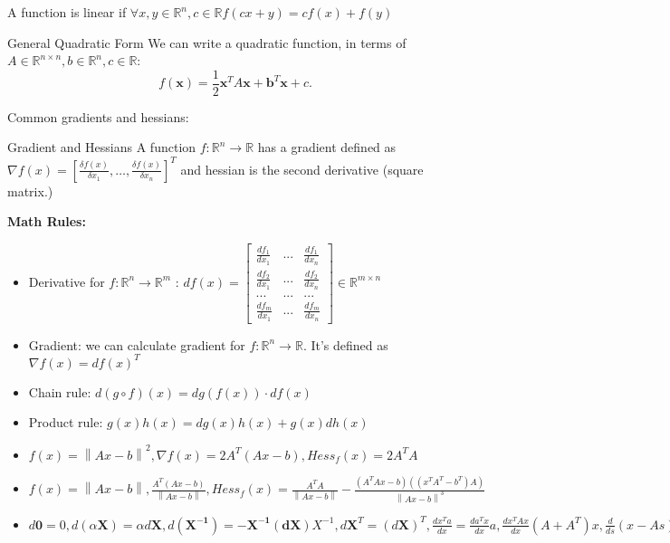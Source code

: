 \documentclass[a4paper]{article}
\begin{document}
A function is linear if $\forall x,y\in\mathbb{R}^n, c\in \mathbb{R} f(cx + y) = cf(x) + f(y)$ 

\begin{subbox}{General Quadratic Form}
    We can write a quadratic function, in terms of $A\in \mathbb{R}^{n\times n}, b\in \mathbb{R}^n, c\in \mathbb{R}$:
    \[
    f(\mathbf{x}) = \frac{1}{2}\mathbf{x}^TA\mathbf{x} + \mathbf{b}^T\mathbf{x} + c
    .\] 
\end{subbox}

Common gradients and hessians:
\begin{mainbox}{Gradient and Hessians}
    A function $f: \mathbb{R}^n \to \mathbb{R}$ has a gradient defined as $\nabla f(x) = \left[\frac{\delta f(x)}{\delta x_1}, \dots, \frac{\delta f(x)}{\delta x_n}\right]^T$ and hessian is the second derivative (square matrix.)   
\end{mainbox}
\textbf{Math Rules:} 
\begin{itemize}
    \item Derivative for $f:\mathbb{R}^n \to \mathbb{R}^m$ :
    $ df(x) = \left[\begin{smallmatrix} 
        \frac{df_1}{dx_1} & ... & \frac{df_1}{dx_n}\\
        \frac{df_2}{dx_1} & ... & \frac{df_2}{dx_n}\\
        ... & ... & ... \\
        \frac{df_m}{dx_1} & ... & \frac{df_m}{dx_n}
    \end{smallmatrix}\right] \in \mathbb{R}^{m\times n}$ 
    \item Gradient: we can calculate gradient for $f: \mathbb{R}^n \to \mathbb{R}$. It's defined as $\nabla f(x) = df(x)^T$ 
    \item Chain rule: $d(g\circ f)(x) = dg(f(x)) \cdot df(x)$ 
    \item Product rule: $g(x)h(x) = dg(x)h(x) + g(x)dh(x)$ 
    \item $f(x)= \left\lVert Ax-b\right\rVert ^2, \nabla f(x) = 2A^T(Ax-b), Hess_f(x) = 2A^TA$
    \item $f(x) = \left\lVert Ax-b\right\rVert, \frac{A^T(Ax-b)}{\left\lVert Ax-b\right\rVert}, Hess_f(x)= \frac{A^TA}{\left\lVert Ax-b\right\rVert }  - \frac{(A^TAx-b)((x^TA^T-b^T)A)}{\left\lVert Ax-b\right\rVert^3 }$  
    \item $d\mathbf{0} = 0, d(\alpha \mathbf{X}) = \alpha d\mathbf{X}, d(\mathbf{X^{-1}}) = -\mathbf{X^{-1}}(\mathbf{dX})X^{-1}, d\mathbf{X}^T = (d\mathbf{X})^T, \frac{dx^Ta}{dx} = \frac{da^Tx}{dx} a, \frac{dx^TAx}{dx} (A+A^T)x, \frac{d}{ds}(x-As)^TW(x-As) = -2A^TW(x-As), \frac{d}{dx}(x-As)^TW(x-As) = 2W(x-As)$    
\end{itemize}
\end{document}
